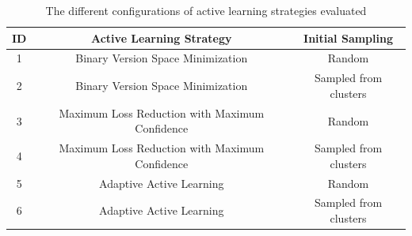 \begin{table}
    \begin{tabular}{|ccc|}
        \hline
        \textbf{ID} & \textbf{Active Learning Strategy} & \textbf{Initial Sampling} \\
        \hline
        1 & Binary Version Space Minimization & Random \\
        2 & Binary Version Space Minimization & Sampled from clusters \\
        3 & Maximum Loss Reduction with Maximum Confidence & Random \\
        4 & Maximum Loss Reduction with Maximum Confidence & Sampled from clusters \\
        5 & Adaptive Active Learning & Random \\
        6 & Adaptive Active Learning & Sampled from clusters \\
        \hline
    \end{tabular}
    \caption{The different configurations of active learning strategies evaluated}
    \label{fig:active-learning-configurations}
\end{table}
